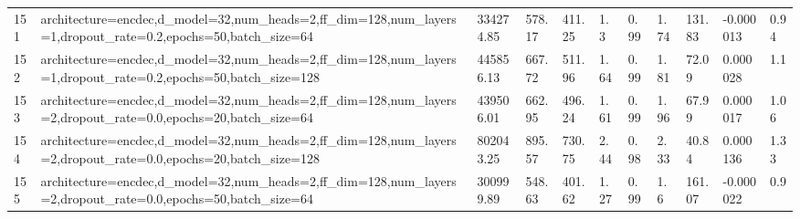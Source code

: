 \begin{longtable}{C{0.8cm} L{2cm} C{1.15cm} C{1.15cm} C{1.15cm} C{1.15cm} C{0.85cm} C{1.25cm} C{1.2cm} C{1.5cm} C{1.0cm}}
151 & architecture=encdec,\newline d\_model=32,\newline num\_heads=2,\newline ff\_dim=128,\newline num\_layers=1,\newline dropout\_rate=0.2,\newline epochs=50,\newline batch\_size=64 & 334274.85 & 578.17 & 411.25 & 1.3 & 0.99 & 1.74 & 131.83 & -0.000013 & 0.94 \\
152 & architecture=encdec,\newline d\_model=32,\newline num\_heads=2,\newline ff\_dim=128,\newline num\_layers=1,\newline dropout\_rate=0.2,\newline epochs=50,\newline batch\_size=128 & 445856.13 & 667.72 & 511.96 & 1.64 & 0.99 & 1.81 & 72.09 & 0.000028 & 1.1 \\
153 & architecture=encdec,\newline d\_model=32,\newline num\_heads=2,\newline ff\_dim=128,\newline num\_layers=2,\newline dropout\_rate=0.0,\newline epochs=20,\newline batch\_size=64 & 439506.01 & 662.95 & 496.24 & 1.61 & 0.99 & 1.96 & 67.99 & 0.000017 & 1.06 \\
154 & architecture=encdec,\newline d\_model=32,\newline num\_heads=2,\newline ff\_dim=128,\newline num\_layers=2,\newline dropout\_rate=0.0,\newline epochs=20,\newline batch\_size=128 & 802043.25 & 895.57 & 730.75 & 2.44 & 0.98 & 2.33 & 40.84 & 0.000136 & 1.33 \\
155 & architecture=encdec,\newline d\_model=32,\newline num\_heads=2,\newline ff\_dim=128,\newline num\_layers=2,\newline dropout\_rate=0.0,\newline epochs=50,\newline batch\_size=64 & 300999.89 & 548.63 & 401.62 & 1.27 & 0.99 & 1.6 & 161.07 & -0.000022 & 0.9 \\

\end{longtable}
